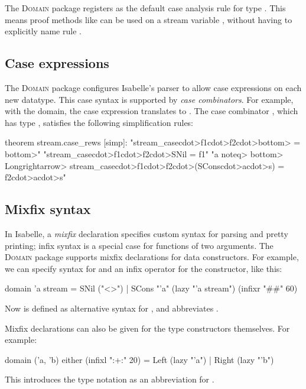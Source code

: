 The \textsc{Domain} package registers  as the default case analysis rule for type . This means proof methods like  can be used on a stream variable , without having to explicitly name rule .

\subsection{Case expressions}

The \textsc{Domain} package configures Isabelle's parser to allow case expressions on each new datatype. This case syntax is supported by \emph{case combinators}. For example, with the  domain, the case expression  translates to . The case combinator , which has type , satisfies the following simplification rules:

\begin{isacode}
theorem stream.case_rews [simp]:
  "stream_case\<cdot>f1\<cdot>f2\<cdot>\<bottom> = \<bottom>"
  "stream_case\<cdot>f1\<cdot>f2\<cdot>SNil = f1"
  "a \<noteq> \<bottom> \<Longrightarrow> stream_case\<cdot>f1\<cdot>f2\<cdot>(SCons\<cdot>a\<cdot>s) = f2\<cdot>a\<cdot>s"
\end{isacode}

\subsection{Mixfix syntax}

In Isabelle, a \emph{mixfix} declaration specifies custom syntax for parsing and pretty printing; infix syntax is a special case for functions of two arguments. The \textsc{Domain} package supports mixfix declarations for data constructors. For example, we can specify syntax for  and an infix operator for the  constructor, like this:
%
\begin{isacode}
domain 'a stream =
  SNil ("<>") | SCons "'a" (lazy "'a stream") (infixr "##" 60)
\end{isacode}
%
Now \isa{<>} is defined as alternative syntax for , and  abbreviates .

Mixfix declarations can also be given for the type constructors themselves. For example:
%
\begin{isacode}
domain ('a, 'b) either (infixl ":+:" 20) = Left (lazy "'a") | Right (lazy "'b")
\end{isacode}
%
This introduces the type notation  as an abbreviation for .

